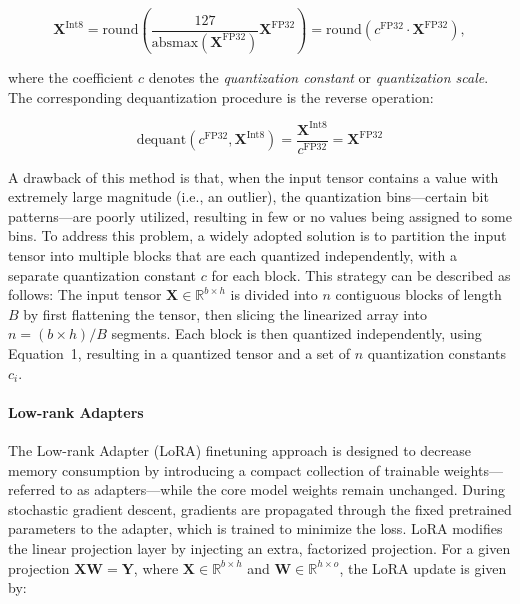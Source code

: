 \begin{equation}
    \mathbf{X}^{ \text{Int8}} = \text{round}\left( \frac{127}{{\text{absmax}}(\mathbf{X}^{{\text{FP32}}})}\mathbf{X}^{{\text{FP32}}} \right) = \text{round}(c^{\text{FP32}}\cdot \mathbf{X}^{{\text{FP32}}}),
\end{equation}

where the coefficient $c$ denotes the {\em quantization constant} or {\em quantization scale}. The corresponding dequantization procedure is the reverse operation:

\begin{equation}
    \text{dequant}(c^{\text{FP32}}, \mathbf{X}^{\text{Int8}}) = \frac{\mathbf{X}^{\text{Int8}}}{c^{\text{FP32}}} = \mathbf{X}^{\text{FP32}}
\end{equation}

A drawback of this method is that, when the input tensor contains a value with extremely large magnitude (i.e., an outlier), the quantization bins—certain bit patterns—are poorly utilized, resulting in few or no values being assigned to some bins. To address this problem, a widely adopted solution is to partition the input tensor into multiple blocks that are each quantized independently, with a separate quantization constant $c$ for each block. This strategy can be described as follows: The input tensor $\mathbf{X}\in \mathbb{R}^{b\times h}$ is divided into $n$ contiguous blocks of length $B$ by first flattening the tensor, then slicing the linearized array into ${n = ({b\times h} )/{B} }$ segments. Each block is then quantized independently, using Equation~1, resulting in a quantized tensor and a set of $n$ quantization constants $c_i$.

\paragraph{Low-rank Adapters} The Low-rank Adapter (LoRA) finetuning approach \citep{hu2021lora} is designed to decrease memory consumption by introducing a compact collection of trainable weights—referred to as adapters—while the core model weights remain unchanged. During stochastic gradient descent, gradients are propagated through the fixed pretrained parameters to the adapter, which is trained to minimize the loss. LoRA modifies the linear projection layer by injecting an extra, factorized projection. For a given projection ${\mathbf{X} \mathbf{W} = \mathbf{Y}}$, where $\mathbf{X}\in  \mathbb{R}^{b\times h}$ and $\mathbf{W}\in  \mathbb{R}^{h\times o}$, the LoRA update is given by:

